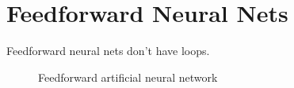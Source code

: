 \section{Feedforward Neural Nets}
\label{ch:Content2:sec:Section2}

Feedforward neural nets don't have loops.

\begin{figure}[ht]
    \centering
    
    \label{fig:feedforward}
    \caption{Feedforward artificial neural network}
\end{figure}